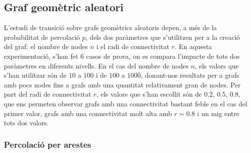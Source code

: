 \documentclass[a4paper]{article}
\begin{document}
	\subsection{Graf geomètric aleatori}
	
	L'estudi de transició sobre grafs geomètrics aleatoris depen, a més de la probabilitat de percolació $p$, dels dos paràmetres que s'utilitzen per a la creació del graf: el nombre de nodes $n$ i el radi de connectivitat $r$. En aquesta experimentació, s'han fet 6 casos de prova, on es compara l'impacte de tots dos paràmetres en diferents nivells. En el cas del nombre de nodes $n$, els valors que s'han utilitzar són de $10$ a $100$ i de $100$ a $1000$, donant-nos resultats per a grafs amb pocs nodes fins a grafs amb una quantitat relativament gran de nodes. Per part del radi de connectivitat $r$, els valors que s'han escollit són de $0.2$, $0.5$, $0.8$, que ens permeten observar grafs amb una connectivitat bastant feble en el cas del primer valor, grafs amb una connectivitat molt alta amb $r = 0.8$ i un mig entre tots dos valors.
	
	\subsubsection{Percolació per arestes}
	
\end{document}
